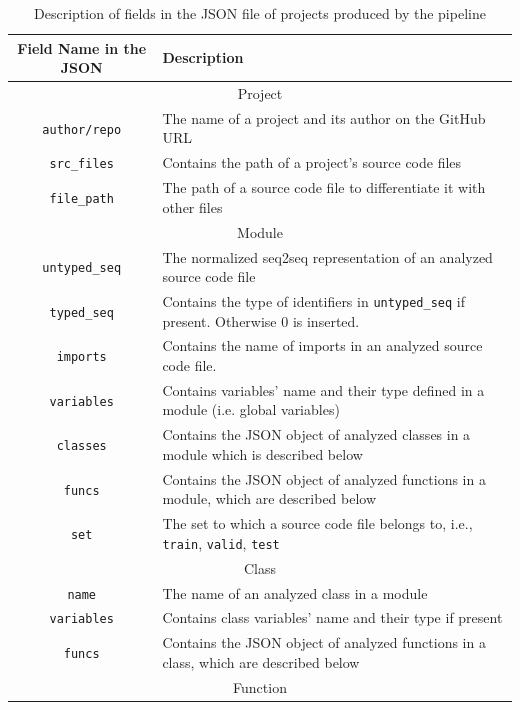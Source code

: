 \documentclass[10pt, conference]{IEEEtran}
\begin{document}
\begin{table}[!t]
	\centering
	\caption{Description of fields in the JSON file of projects produced by the pipeline}
	\label{tab:json-fields}
	\begin{tabular}{c l}
		\toprule
		Field Name in the JSON & Description \\
		\midrule
		\multicolumn{2}{c}{Project}  \\
		\midrule
		\texttt{author/repo} & The name of a project and its author on the GitHub URL  \\
		\midrule
		\texttt{src\_files} & Contains the path of a project's source code files \\
		\midrule
		\texttt{file\_path} & The path of a source code file to differentiate it with other files \\
		\midrule
		\multicolumn{2}{c}{Module}  \\
		\midrule
		\texttt{untyped\_seq} & The normalized seq2seq representation of an analyzed source code file \\
		\midrule
		\texttt{typed\_seq} & Contains the type of identifiers in \texttt{untyped\_seq} if present. Otherwise $0$ is inserted. \\
		\midrule
		\texttt{imports} & Contains the name of imports in an analyzed source code file. \\
		\midrule
		\texttt{variables} & Contains variables' name and their type defined in a module (i.e. global variables) \\
		\midrule
		\texttt{classes} & Contains the JSON object of analyzed classes in a module which is described below \\
		\midrule
		\texttt{funcs} &  Contains the JSON object of analyzed functions in a module, which are described below \\
		\midrule
		\texttt{set} & The set to which a source code file belongs to, i.e., \texttt{train}, \texttt{valid}, \texttt{test} \\
		\midrule
		\multicolumn{2}{c}{Class} \\
		\midrule
		\texttt{name} & The name of an analyzed class in a module \\
		\midrule
		\texttt{variables} & Contains class variables' name and their type if present \\
		\midrule
		\texttt{funcs} & Contains the JSON object of analyzed functions in a class, which are described below \\
		\midrule
		\multicolumn{2}{c}{Function} \\

\end{tabular}
\end{table}
\end{document}
